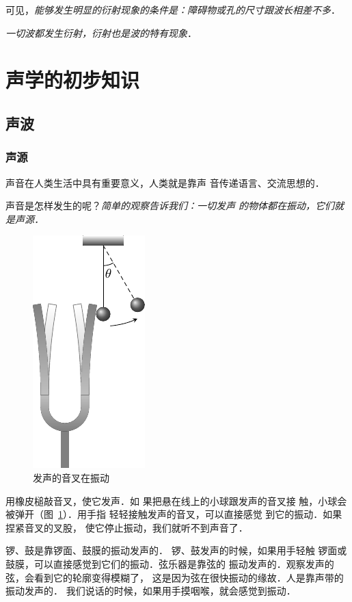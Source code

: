 可见，\textit{能够发生明显的衍射现象的条件是：障碍物或孔的尺寸跟波长相差不多}．

\textit{一切波都发生衍射，衍射也是波的特有现象}．

\section{声学的初步知识}
\subsection{声波}
\subsubsection{声源} 

声音在人类生活中具有重要意义，人类就是靠声
音传递语言、交流思想的．

声音是怎样发生的呢？\textit{简单的观察告诉我们：一切发声
的物体都在振动，它们就是声源．}
\begin{figure}[htbp]
    \centering
    \includegraphics{fig/A/9-25.pdf}
    \caption{发声的音叉在振动}\label{fig_A_9-25}
\end{figure}

用橡皮槌敲音叉，使它发声．如
果把悬在线上的小球跟发声的音叉接
触，小球会被弹开（图~\ref{fig_A_9-25}）．用手指
轻轻接触发声的音叉，可以直接感觉
到它的振动．如果捏紧音叉的叉股，
使它停止振动，我们就听不到声音了．

锣、鼓是靠锣面、鼓膜的振动发声的．
锣、鼓发声的时候，如果用手轻触
锣面或鼓膜，可以直接感觉到它们的振动．弦乐器是靠弦的
振动发声的．观察发声的弦，会看到它的轮廓变得模糊了，
这是因为弦在很快振动的缘故．人是靠声带的振动发声的．
我们说话的时候，如果用手摸咽喉，就会感觉到振动．

